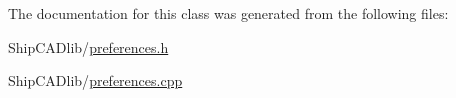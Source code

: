The documentation for this class was generated from the following files\+:\begin{DoxyCompactItemize}
\item 
Ship\+C\+A\+Dlib/\hyperlink{preferences_8h}{preferences.\+h}\item 
Ship\+C\+A\+Dlib/\hyperlink{preferences_8cpp}{preferences.\+cpp}\end{DoxyCompactItemize}
